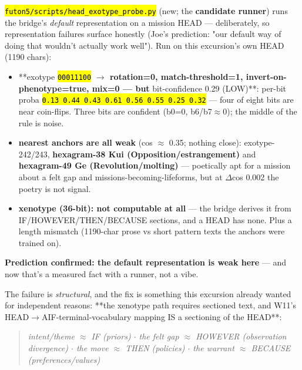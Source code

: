 \documentclass[11pt,oneside]{article}
\newcommand{\scopehl}[1]{\texttt{\hl{#1}}}
\begin{document}
\begin{phasebox}[title={3. DERIVE --- opened with a candidate runner (2026-06-10)}]

\begin{subbox}[title={3.1 The probe: this HEAD, through the default chain}]

\scopehl{futon5/scripts/head\_exotype\_probe.py} (new; the \textbf{candidate runner}) runs
the bridge's \emph{default} representation on a mission HEAD --- deliberately, so
representation failures surface honestly (Joe's prediction: "our default way
of doing that wouldn't actually work well"). Run on this excursion's own HEAD
(1190 chars):

\begin{itemize}[leftmargin=1.2em,itemsep=1pt]
\item **exotype \scopehl{00011100}\textbf{ $\rightarrow$ rotation=0, match-threshold=1, invert-on-phenotype=true, mix=0 --- but }bit-confidence 0.29 (LOW)**: per-bit proba \scopehl{0.13 0.44 0.43 0.61 0.56 0.55 0.25 0.32} --- four of eight bits are near coin-flips. Three bits are confident (b0=0, b6/b7$\approx$0); the middle of the rule is noise.
\item \textbf{nearest anchors are all weak} (cos $\approx$ 0.35; nothing close): exotype-242/243, \textbf{hexagram-38 Kui  (Opposition/estrangement)} and \textbf{hexagram-49 Ge  (Revolution/molting)} --- poetically apt for a mission about a felt gap and missions-becoming-lifeforms, but at $\Delta$cos 0.002 the poetry is not signal.
\item \textbf{xenotype (36-bit): not computable at all} --- the bridge derives it from IF/HOWEVER/THEN/BECAUSE sections, and a HEAD has none. Plus a length mismatch (1190-char prose vs short pattern texts the anchors were trained on).
\end{itemize}

\textbf{Prediction confirmed: the default representation is weak here} --- and now
that's a measured fact with a runner, not a vibe.

\end{subbox}
\begin{subbox}[title={3.2 The representation finding (the convergence)}]

The failure is \emph{structural}, and the fix is something this excursion already
wanted for independent reasons: **the xenotype path requires sectioned text,
and W11's HEAD$\rightarrow$AIF-terminal-vocabulary mapping IS a sectioning of the HEAD**:

\begin{quote}\itshape
intent/theme $\approx$ IF (priors) $\cdot$ the felt gap $\approx$ HOWEVER (observation
divergence) $\cdot$ the move $\approx$ THEN (policies) $\cdot$ the warrant $\approx$ BECAUSE
(preferences/values)
\end{quote}


\end{subbox}
\end{phasebox}
\end{document}
